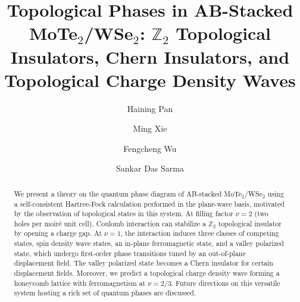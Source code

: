 \documentclass[aps,prl,twocolumn,superscriptaddress,longbibliography]{revtex4-2}
\begin{document}
\title{Topological Phases in AB-Stacked MoTe$_2$/WSe$_2$: $\mathbb{Z}_2$ Topological Insulators, Chern Insulators, and Topological Charge Density Waves}

\author{Haining Pan}

\author{Ming Xie}

\author{Fengcheng Wu}

\author{Sankar Das Sarma}

\begin{abstract}
    We present a theory on the quantum phase diagram of AB-stacked MoTe$_2$/WSe$_2$ using a self-consistent Hartree-Fock calculation performed in the plane-wave basis, motivated by the observation of topological states in this system. At filling factor $\nu=2$ (two holes per moir\'e unit cell), Coulomb interaction can stabilize a $\mathbb{Z}_2$ topological insulator by opening a charge gap. At $\nu=1$, the interaction induces three classes of competing states, spin density wave states, an in-plane ferromagnetic state, and a valley polarized state, which undergo first-order phase transitions tuned by an out-of-plane displacement field. The valley polarized state becomes a Chern insulator for certain displacement fields.  Moreover, we predict a topological charge density wave forming a honeycomb lattice with ferromagnetism at $\nu=2/3$. Future directions on this versatile system hosting a rich set of quantum phases are discussed.
\end{abstract}

\maketitle
\end{document}
